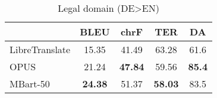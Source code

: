 \documentclass[11pt]{article}
\begin{document}
\begin{table}
    \centering
    \begin{tabular}{lcccc}
    \hline
        & BLEU & chrF & TER & DA\\
    \hline
        LibreTranslate & 15.35 & 41.49 & 63.28 & 61.6\\
        OPUS & 21.24 & \textbf{47.84} & 59.56 & \textbf{85.4} \\
        MBart-50 & \textbf{24.38} & 51.37 & \textbf{58.03} & 83.5
    \end{tabular}
    \caption{Legal domain (DE>EN)}
\end{table}




\end{document}
